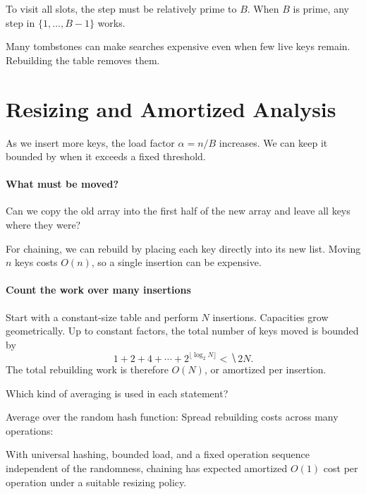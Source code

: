 \documentclass[11pt]{article}
\begin{document}
To visit all slots, the step must be relatively prime to $B$. When $B$ is
prime, any step in $\{1,\ldots,B-1\}$ works.

\vfill
Many tombstones can make searches expensive even when few live keys remain.
Rebuilding the table removes them.

\newpage
\section{Resizing and Amortized Analysis}
As we insert more keys, the load factor $\alpha=n/B$ increases. We can keep it
bounded by  when it exceeds a fixed threshold.

\paragraph{What must be moved?}
Can we copy the old array into the first half of the new array and leave all
keys where they were?
\vs{.6cm}

For chaining, we can rebuild by placing each key directly into its new list.
Moving $n$ keys costs $O(n)$, so a single insertion can be expensive.

\paragraph{Count the work over many insertions}
Start with a constant-size table and perform $N$ insertions. Capacities grow
geometrically. Up to constant factors, the total number of keys moved is
bounded by
\begin{equation*}
    1+2+4+\cdots+2^{\lfloor\log_2 N\rfloor}<\hide{2N}.
\end{equation*}
The total rebuilding work is therefore $O(N)$, or 
amortized per insertion.

\begin{Qu}
    Which kind of averaging is used in each statement?
    \begin{itemize}
        \aitem Average over the random hash function: 
        \bitem Spread rebuilding costs across many operations: 
    \end{itemize}
\end{Qu}

With universal hashing, bounded load, and a fixed operation sequence
independent of the randomness, chaining has expected amortized $O(1)$ cost
per operation under a suitable resizing policy.
\end{document}
